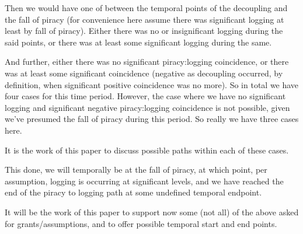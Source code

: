 \documentclass{amsart}
\theoremstyle{definition}%
\theoremstyle{definition}%
\theoremstyle{remark}%
\theoremstyle{definition}%
\theoremstyle{definition}%
\begin{document}
Then we would have one of between the temporal points of the decoupling and the fall of piracy (for convenience here assume there was significant logging at least by fall of piracy). Either there was no or insignificant logging during the said points, or there was at least some significant logging during the same. %

And further, either there was no significant piracy:logging coincidence, or there was at least some significant coincidence (negative as decoupling occurred, by definition, when significant positive coincidence was no more). So in total we have four cases for this time period. %
However, the case where we have no significant logging and significant negative piracy:logging coincidence is not possible, given we've presumed the fall of piracy during this period. So really we have three cases here.

It is the work of this paper to discuss possible paths within each of these cases.

This done, we will temporally be at the fall of piracy, at which point, per assumption, logging is occurring at significant levels, and we have reached the end of the piracy to logging path at some undefined temporal endpoint.

It will be the work of this paper to support now some (not all) of the above asked for grants/assumptions, and to offer possible temporal start and end points.
%
\end{document}
